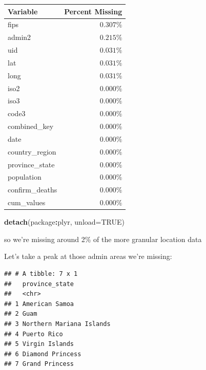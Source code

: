 \documentclass[
]{article}
\newenvironment{Shaded}{\begin{snugshade}}{\end{snugshade}}
\newcommand{\DataTypeTok}[1]{\textcolor[rgb]{0.13,0.29,0.53}{#1}}
\newcommand{\KeywordTok}[1]{\textcolor[rgb]{0.13,0.29,0.53}{\textbf{#1}}}
\newcommand{\NormalTok}[1]{#1}
\newcommand{\OperatorTok}[1]{\textcolor[rgb]{0.81,0.36,0.00}{\textbf{#1}}}
\newcommand{\OtherTok}[1]{\textcolor[rgb]{0.56,0.35,0.01}{#1}}
\newcommand{\StringTok}[1]{\textcolor[rgb]{0.31,0.60,0.02}{#1}}
\begin{document}
\captionsetup[table]{labelformat=empty,skip=1pt}
\begin{longtable}{lr}
\toprule
Variable & Percent Missing \\ 
\midrule
fips & $0.307\%$ \\ 
admin2 & $0.215\%$ \\ 
uid & $0.031\%$ \\ 
lat & $0.031\%$ \\ 
long & $0.031\%$ \\ 
iso2 & $0.000\%$ \\ 
iso3 & $0.000\%$ \\ 
code3 & $0.000\%$ \\ 
combined\_key & $0.000\%$ \\ 
date & $0.000\%$ \\ 
country\_region & $0.000\%$ \\ 
province\_state & $0.000\%$ \\ 
population & $0.000\%$ \\ 
confirm\_deaths & $0.000\%$ \\ 
cum\_values & $0.000\%$ \\ 
\bottomrule
\end{longtable}

\begin{Shaded}
\begin{Highlighting}[]
\KeywordTok{detach}\NormalTok{(package}\OperatorTok{:}\NormalTok{plyr, }\DataTypeTok{unload=}\OtherTok{TRUE}\NormalTok{)}
\end{Highlighting}
\end{Shaded}

so we're missing around 2\% of the more granular location data

Let's take a peak at those admin areas we're missing:

\begin{Shaded}
\end{Shaded}

\begin{verbatim}
## # A tibble: 7 x 1
##   province_state          
##   <chr>                   
## 1 American Samoa          
## 2 Guam                    
## 3 Northern Mariana Islands
## 4 Puerto Rico             
## 5 Virgin Islands          
## 6 Diamond Princess        
## 7 Grand Princess
\end{verbatim}
\end{document}
